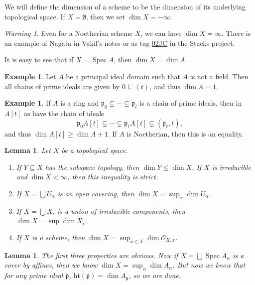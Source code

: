 \documentclass[leqno, openany]{memoir}
\newtheorem{lem}[thm]{Lemma}
\theoremstyle{definition}
\newtheorem{exm}[thm]{Example}
\theoremstyle{remark}
\newtheorem{warn}[thm]{Warning}
\theoremstyle{plain}
\theoremstyle{definition}
\theoremstyle{remark}
\newcommand{\mf}[1]{\mathfrak{#1}}
\newcommand{\mr}[1]{\mathrm{#1}}
\newcommand{\msc}[1]{\mathscr{#1}}
\DeclareMathOperator{\Spec}{Spec}
\begin{document}
We will define the dimension of a scheme to be the dimension of its underlying topological space. If $X = \emptyset$, then we set $\dim X = - \infty$. 

\begin{warn}
    Even for a Noetherian scheme $X$, we can have $\dim X = \infty$. There is an example of Nagata in Vakil's notes or as tag \href{https://stacks.math.columbia.edu/tag/02JC}{02JC} in the Stacks project.
\end{warn}

It is easy to see that if $X = \Spec A$, then $\dim X = \dim A$.

\begin{exm}
    Let $A$ be a principal ideal domain such that $A$ is not a field. Then all chains of prime ideals are given by $0 \subseteq (t)$, and thus $\dim A = 1$.
\end{exm}

\begin{exm}
    If $A$ is a ring and $\mf{p}_0 \subsetneq \cdots \subsetneq \mf{p}_{\ell}$ is a chain of prime ideals, then in $A[t]$ as have the chain of ideals
    \[ \mf{p}_0 A[t] \subsetneq \cdots \subsetneq \mf{p}_{\ell} A[t] \subsetneq (\mf{p}_{\ell}, t), \]
    and thus $\dim A[t] \geq \dim A + 1$. If $A$ is Noetherian, then this is an equality.
\end{exm}

\begin{lem}
    Let $X$ be a topological space.
    \begin{enumerate}
        \item If $Y \subseteq X$ has the subspace topology, then $\dim Y \leq \dim X$. If $X$ is irreducible and $\dim X < \infty$, then this inequality is strict.
        \item If $X = \bigcup U_{\alpha}$ is an open covering, then $\dim X = \sup_{\alpha} \dim U_{\alpha}$.
        \item If $X = \bigcup X_i$ is a union of irreducible components, then $\dim X = \sup \dim X_i$.
        \item If $X$ is a scheme, then $\dim X = \sup_{x \in X} \dim \msc{O}_{X,x}$.
    \end{enumerate}
\end{lem}

\begin{lem}
    The first three properties are obvious. Now if $X = \bigcup \Spec A_{\alpha}$ is a cover by affines, then we know $\dim X = \sup_{\alpha} \dim A_{\alpha}$. But now we know that for any prime ideal $\mf{p}$, $\mr{ht}(\mf{p}) = \dim A_{\mf{p}}$, so we are done.
\end{lem}
\end{document}
